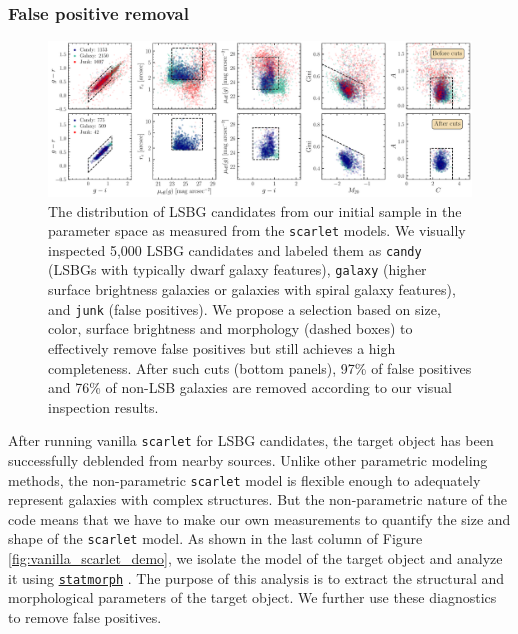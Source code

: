 \documentclass[twocolumn,astrosymb,twocolappendix]{aastex631}
\newcommand{\code}[1]{\texttt{#1}}
\begin{document}
\begin{CJK*}{UTF8}{gbsn}

\subsubsection{False positive removal}\label{sec:non-par-measurement}

\begin{figure}
	\vbox{
		\centering
		\includegraphics[width=1.0\linewidth]{deblending_cuts.pdf}
	}
	\caption{The distribution of LSBG candidates from our initial sample in the parameter space as measured from the \code{scarlet} models. We visually inspected 5,000 LSBG candidates and labeled them as \code{candy} (LSBGs with typically dwarf galaxy features), \code{galaxy} (higher surface brightness galaxies or galaxies with spiral galaxy features), and \code{junk} (false positives). We propose a selection based on size, color, surface brightness and morphology (dashed boxes) to effectively remove false positives but still achieves a high completeness. After such cuts (bottom panels), 97\% of false positives and 76\% of non-LSB galaxies are removed according to our visual inspection results. 
	}
	\label{fig:deblending_cuts}
\end{figure}

After running vanilla \code{scarlet} for LSBG candidates, the target object has been successfully deblended from nearby sources. Unlike other parametric modeling methods, the non-parametric \code{scarlet} model is flexible enough to adequately represent galaxies with complex structures. But the non-parametric nature of the code means that we have to make our own measurements to quantify the size and shape of the \code{scarlet} model. As shown in the last column of Figure \ref{fig:vanilla_scarlet_demo}, we isolate the model of the target object and analyze it using \href{https://statmorph.readthedocs.io/en/latest/}{\code{statmorph}} \citep{statmorph}. The purpose of this analysis is to extract the structural and morphological parameters of the target object. We further use these diagnostics to remove false positives. 


\end{CJK*}
\end{document}
